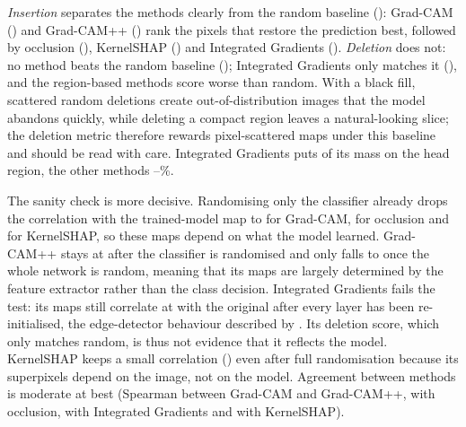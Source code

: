 \documentclass[11pt,a4paper]{article}
\begin{document}
\begin{table}[t]
\centering\small
\caption{Faithfulness (mean $\pm$ s.d.\ over 100 Testing images), attribution mass on the head region, and Spearman correlation with the trained-model map after randomising the classifier only and after randomising the whole network (12 images).}
\label{tab:xai}
\resizebox{\linewidth}{!}{}
\end{table}

\emph{Insertion} separates the methods clearly from the random baseline (\InsRandom{}): Grad-CAM (\InsGradcam{}) and Grad-CAM++ (\InsGradcamPP{}) rank the pixels that restore the prediction best, followed by occlusion (\InsOcclusion{}), KernelSHAP (\InsKernelShap{}) and Integrated Gradients (\InsIntegratedGradients{}). \emph{Deletion} does not: no method beats the random baseline (\DelRandom{}); Integrated Gradients only matches it (\DelIntegratedGradients{}), and the region-based methods score worse than random. With a black fill, scattered random deletions create out-of-distribution images that the model abandons quickly, while deleting a compact region leaves a natural-looking slice; the deletion metric therefore rewards pixel-scattered maps under this baseline and should be read with care. Integrated Gradients puts \FgIntegratedGradients{} of its mass on the head region, the other methods \FgMin--\FgMax\%.

The sanity check is more decisive. Randomising only the classifier already drops the correlation with the trained-model map to \SanClsGradcam{} for Grad-CAM, \SanClsOcclusion{} for occlusion and \SanClsKernelShap{} for KernelSHAP, so these maps depend on what the model learned. Grad-CAM++ stays at \SanClsGradcamPP{} after the classifier is randomised and only falls to \SanAllGradcamPP{} once the whole network is random, meaning that its maps are largely determined by the feature extractor rather than the class decision. Integrated Gradients fails the test: its maps still correlate at \SanAllIntegratedGradients{} with the original after every layer has been re-initialised, the edge-detector behaviour described by \citet{adebayo2018}. Its deletion score, which only matches random, is thus not evidence that it reflects the model. KernelSHAP keeps a small correlation (\SanAllKernelShap{}) even after full randomisation because its superpixels depend on the image, not on the model. Agreement between methods is moderate at best (Spearman \AgGcPP{} between Grad-CAM and Grad-CAM++, \AgGcOcc{} with occlusion, \AgGcIG{} with Integrated Gradients and \AgGcShap{} with KernelSHAP).
\end{document}
